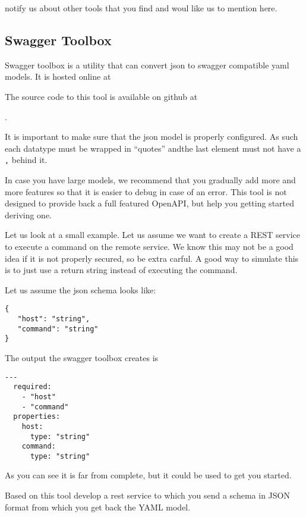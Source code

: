 \begin{exercise}
notify us about other tools that you find and woul like us to mention here.
\end{exercise}

\subsection{Swagger Toolbox}
\label{s:swagger-toolbox}

Swagger toolbox is a utility that can convert json to swagger
compatible yaml models. It is hosted online at 


The source code to this tool is available on github at

.

It is important to make sure that the json model is properly
configured. As such each datatype must be wrapped in ``quotes'' andthe
last element must not have a \verb|,| behind it. 

In case you have large models, we recommend that you gradually add
more and more features so that it is easier to debug in case of an
error. This tool is not designed to provide back a full featured
OpenAPI, but help you getting started deriving one.

Let us look at a small example. Let us assume we want to create a REST
service to execute a command on the remote service. We  know this may
not be a good idea if it is not properly secured, so be extra
carful. A good way to simulate this is to just use a return string
instead of executing the command.

Let us assume the json schema looks like:

\begin{lstlisting}
{
   "host": "string",
   "command": "string"
}
\end{lstlisting}

The output the swagger toolbox creates is

\begin{lstlisting}
---
  required: 
    - "host"
    - "command"
  properties: 
    host: 
      type: "string"
    command: 
      type: "string"
\end{lstlisting}

As you can see it is far from complete, but it could be used to get
you started.

\begin{exercise}
Based on this tool develop a rest service to which you send a schema
in JSON format from which you get back the YAML model.
\end{exercise}



